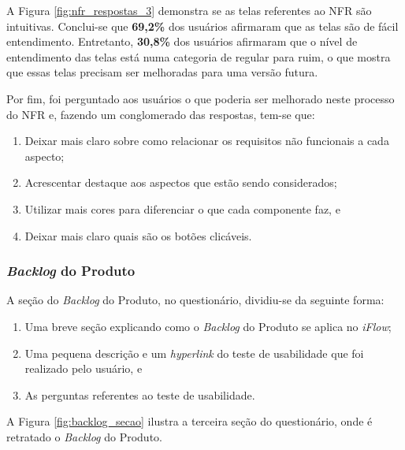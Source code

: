 A Figura \ref{fig:nfr_respostas_3} demonstra se as telas referentes ao NFR são intuitivas. Conclui-se que \textbf{69,2\%} dos usuários afirmaram que as telas são de fácil entendimento. Entretanto, \textbf{30,8\%} dos usuários afirmaram que o nível de entendimento das telas está numa categoria de regular para ruim, o que mostra que essas telas precisam ser melhoradas para uma versão futura.

Por fim, foi perguntado aos usuários o que poderia ser melhorado neste processo do NFR e, fazendo um conglomerado das respostas, tem-se que:

\begin{enumerate}
    \item Deixar mais claro sobre como relacionar os requisitos não funcionais a cada aspecto;
    \item Acrescentar destaque aos aspectos que estão sendo considerados;
    \item Utilizar mais cores para diferenciar o que cada componente faz, e
    \item Deixar mais claro quais são os botões clicáveis.
\end{enumerate}


\subsubsection{\textit{Backlog} do Produto}
A seção do \textit{Backlog} do Produto, no questionário, dividiu-se da seguinte forma:

\begin{enumerate}
    \item Uma breve seção explicando como o \textit{Backlog} do Produto se aplica no \textit{iFlow};
    \item Uma pequena descrição e um \textit{hyperlink} do teste de usabilidade que foi realizado pelo usuário, e
    \item As perguntas referentes ao teste de usabilidade.
\end{enumerate}

A Figura \ref{fig:backlog_secao} ilustra a terceira seção do questionário, onde é retratado o \textit{Backlog} do Produto.

